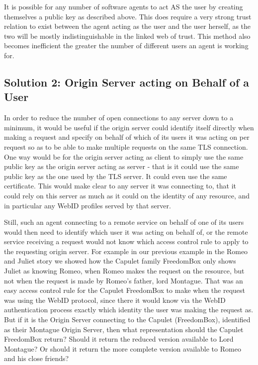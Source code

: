 \documentclass[a4paper]{llncs}
\begin{document}
It is possible for any number of software agents to act AS the user by creating themselves a public key as described above.
This does require a very strong trust relation to exist between the agent acting as the user and the user herself, as the two will be mostly indistinguishable in the linked web of trust. 
This method also becomes inefficient the greater the number of different users  an agent is working for.
 
\subsection{Solution 2: Origin Server acting on Behalf of a User}

In order to reduce the number of open connections to any server down to a minimum, it would be useful if the origin server could identify itself directly when making a request and specify on behalf of which of its users it was acting on per request so as to be able to make multiple requests on the same TLS connection.
One way would be for the origin server acting as client to simply use the same public key as the origin server acting as server - that is it could use the same public key as the one used by the TLS server.
It could even use the same certificate.
This would make clear to any server it was connecting to, that it could rely on this server as much as it could on the identity of any resource, and in particular any WebID profiles served by that server.

Still, such an agent connecting to a remote service on behalf of one of its users would then need to identify which user it was acting on behalf of, or the remote service receiving a request would not know which access control rule to apply to the requesting origin server.
For example in our previous example in the Romeo and Juliet story we showed how the Capulet family FreedomBox only shows Juliet as knowing Romeo, when Romeo makes the request on the resource, but not when the request is made by Romeo's father, lord Montague.
That was an easy access control rule for the Capulet FreedomBox to make when the request was using the WebID protocol, since there it would know via the WebID authentication process exactly which identity the user was making the request as. 
But if it is the Origin Server connecting to the Capulet (FreedomBox), identified as their Montague Origin Server, then what representation should the Capulet FreedomBox return? 
Should it return the reduced version available to Lord Montague?
Or should it return the more complete version available to Romeo and his close friends?
\end{document}
